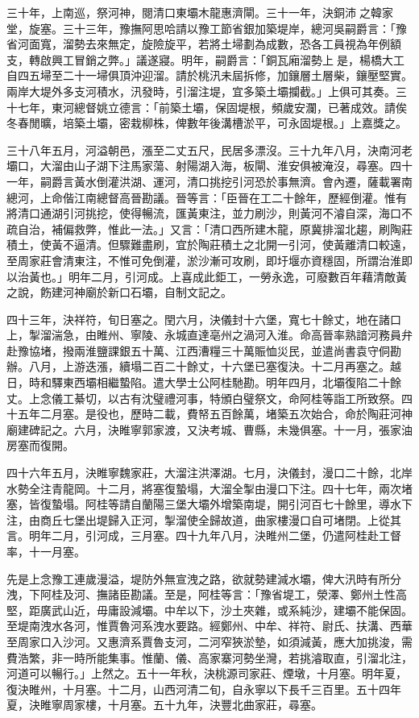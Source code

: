 \begin{pinyinscope}
三十年，上南巡，祭河神，閱清口東壩木龍惠濟閘。三十一年，決銅沛之韓家堂，旋塞。三十三年，豫撫阿思哈請以豫工節省銀加築堤岸，總河吳嗣爵言：「豫省河面寬，溜勢去來無定，旋險旋平，若將土埽劃為成數，恐各工員視為年例額支，轉啟興工冒銷之弊。」議遂寢。明年，嗣爵言：「銅瓦廂溜勢上是，楊橋大工自四五埽至二十一埽俱頂沖迎溜。請於桃汛未屆拆修，加鑲層土層柴，鑲壓堅實。兩岸大堤外多支河積水，汛發時，引溜注堤，宜多築土壩攔截。」上俱可其奏。三十七年，東河總督姚立德言：「前築土壩，保固堤根，頻歲安瀾，已著成效。請俟冬春閒曠，培築土壩，密栽柳株，俾數年後溝槽淤平，可永固堤根。」上嘉獎之。

三十八年五月，河溢朝邑，漲至二丈五尺，民居多漂沒。三十九年八月，決南河老壩口，大溜由山子湖下注馬家蕩、射陽湖入海，板閘、淮安俱被淹沒，尋塞。四十一年，嗣爵言黃水倒灌洪湖、運河，清口挑挖引河恐於事無濟。會內遷，薩載署南總河，上命偕江南總督高晉勘議。晉等言：「臣晉在工二十餘年，歷經倒灌。惟有將清口通湖引河挑挖，使得暢流，匯黃東注，並力刷沙，則黃河不濬自深，海口不疏自治，補偏救弊，惟此一法。」又言：「清口西所建木龍，原冀排溜北趨，刷陶莊積土，使黃不逼清。但驟難盡刷，宜於陶莊積土之北開一引河，使黃離清口較遠，至周家莊會清東注，不惟可免倒灌，淤沙漸可攻刷，即圩堰亦資穩固，所謂治淮即以治黃也。」明年二月，引河成。上喜成此鉅工，一勞永逸，可廢數百年藉清敵黃之說，飭建河神廟於新口石壩，自制文記之。

四十三年，決祥符，旬日塞之。閏六月，決儀封十六堡，寬七十餘丈，地在諸口上，掣溜湍急，由睢州、寧陵、永城直達亳州之渦河入淮。命高晉率熟諳河務員弁赴豫協堵，撥兩淮鹽課銀五十萬、江西漕糧三十萬賑恤災民，並遣尚書袁守侗勘辦。八月，上游迭漲，續塌二百二十餘丈，十六堡已塞復決。十二月再塞之。越日，時和驛東西壩相繼蟄陷。遣大學士公阿桂馳勘。明年四月，北壩復陷二十餘丈。上念儀工綦切，以古有沈璧禮河事，特頒白璧祭文，命阿桂等詣工所致祭。四十五年二月塞。是役也，歷時二載，費帑五百餘萬，堵築五次始合，命於陶莊河神廟建碑記之。六月，決睢寧郭家渡，又決考城、曹縣，未幾俱塞。十一月，張家油房塞而復開。

四十六年五月，決睢寧魏家莊，大溜注洪澤湖。七月，決儀封，漫口二十餘，北岸水勢全注青龍岡。十二月，將塞復蟄塌，大溜全掣由漫口下注。四十七年，兩次堵塞，皆復蟄塌。阿桂等請自蘭陽三堡大壩外增築南堤，開引河百七十餘里，導水下注，由商丘七堡出堤歸入正河，掣溜使全歸故道，曲家樓漫口自可堵閉。上從其言。明年二月，引河成，三月塞。四十九年八月，決睢州二堡，仍遣阿桂赴工督率，十一月塞。

先是上念豫工連歲漫溢，堤防外無宣洩之路，欲就勢建減水壩，俾大汛時有所分洩，下阿桂及河、撫諸臣勘議。至是，阿桂等言：「豫省堤工，滎澤、鄭州土性高堅，距廣武山近，毋庸設減壩。中牟以下，沙土夾雜，或系純沙，建壩不能保固。至堤南洩水各河，惟賈魯河系洩水要路。經鄭州、中牟、祥符、尉氏、扶溝、西華至周家口入沙河。又惠濟系賈魯支河，二河窄狹淤墊，如須減黃，應大加挑浚，需費浩繁，非一時所能集事。惟蘭、儀、高家寨河勢坐灣，若挑濬取直，引溜北注，河道可以暢行。」上然之。五十一年秋，決桃源司家莊、煙墩，十月塞。明年夏，復決睢州，十月塞。十二月，山西河清二旬，自永寧以下長千三百里。五十四年夏，決睢寧周家樓，十月塞。五十九年，決豐北曲家莊，尋塞。


\end{pinyinscope}
